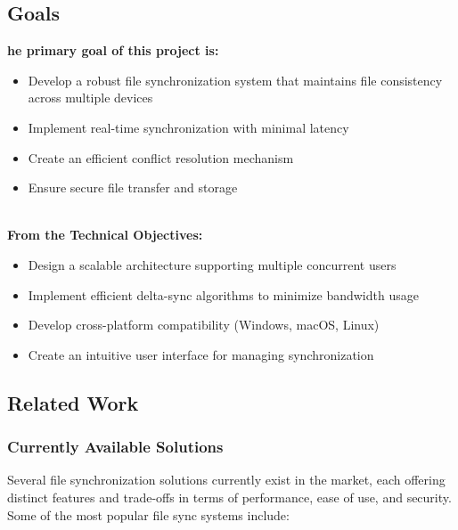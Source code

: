 \documentclass{article}
\begin{document}
    \subsection{Goals}
      \textbf{he primary goal of this project is:}
      \begin{itemize}
        \item Develop a robust file synchronization system that maintains file consistency across multiple devices
        \item Implement real-time synchronization with minimal latency
                    \item Create an efficient conflict resolution mechanism
        \item Ensure secure file transfer and storage
      \end{itemize} \\ \textbf{From the Technical Objectives:}
      \begin{itemize}
        \item Design a scalable architecture supporting multiple concurrent users
        \item Implement efficient delta-sync algorithms to minimize bandwidth usage
        \item Develop cross-platform compatibility (Windows, macOS, Linux)
        \item Create an intuitive user interface for managing synchronization
      \end{itemize}
    \subsection{Related Work}
                        \subsubsection{Currently Available Solutions}
        Several file synchronization solutions currently exist in the market, each offering distinct features and trade-offs in terms of performance, ease of use, and security. Some of the most popular file sync systems include:
\end{document}
